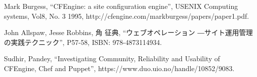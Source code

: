 Mark Burgess, ``CFEngine: a site configuration engine'',
USENIX Computing systems, Vol8, No. 3 1995,
http://cfengine.com/markburgess/papers/paper1.pdf.

John Allspaw, Jesse Robbins, 角 征典,
``ウェブオペレーション ―サイト運用管理の実践テクニック'',
P57-58, ISBN: 978-4873114934.

Sudhir, Pandey,
``Investigating Community, Reliability and Usability of CFEngine, Chef and Puppet'',
https://www.duo.uio.no/handle/10852/9083.
